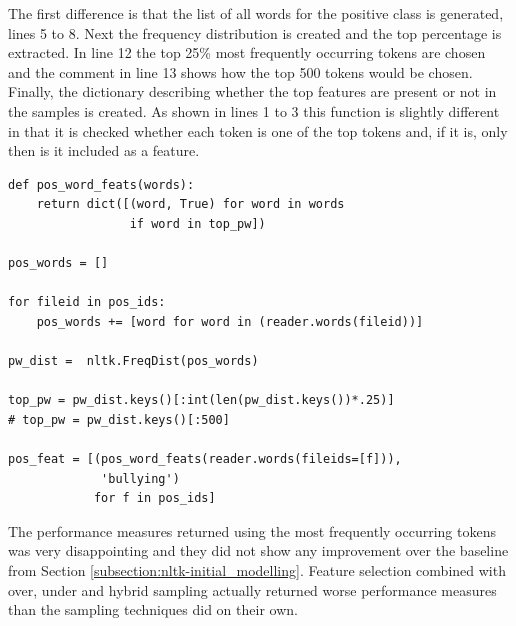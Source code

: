 The first difference is that the list of all words for the positive class is generated, lines 5 to 8. Next the frequency distribution is created and the top percentage is extracted. In line 12 the top 25\% most frequently occurring tokens are chosen and the comment in line 13 shows how the top 500 tokens would be chosen. Finally, the dictionary describing whether the top features are present or not in the samples is created. As shown in lines 1 to 3 this function is slightly different in that it is checked whether each token is one of the top tokens and, if it is, only then is it included as a feature.

\begin{lstlisting}[caption={Selecting the most frequently occuring tokens}, label=lst:chapter5.2:snipet_04]
def pos_word_feats(words):
    return dict([(word, True) for word in words
                 if word in top_pw])

pos_words = []

for fileid in pos_ids:
    pos_words += [word for word in (reader.words(fileid))]

pw_dist =  nltk.FreqDist(pos_words)

top_pw = pw_dist.keys()[:int(len(pw_dist.keys())*.25)]
# top_pw = pw_dist.keys()[:500]

pos_feat = [(pos_word_feats(reader.words(fileids=[f])),
             'bullying')
            for f in pos_ids]
\end{lstlisting}

The performance measures returned using the most frequently occurring tokens was very disappointing and they did not show any improvement over the baseline from Section \ref{subsection:nltk-initial_modelling}. Feature selection combined with over, under and hybrid sampling actually returned worse performance measures than the sampling techniques did on their own.  